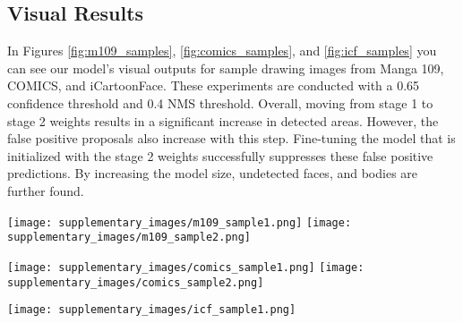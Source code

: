 \documentclass{article}
\begin{document}
\subsection{Visual Results}

In Figures \ref{fig:m109_samples}, \ref{fig:comics_samples}, and \ref{fig:icf_samples} you can see our model's visual outputs for sample drawing images from Manga 109, COMICS, and iCartoonFace. These experiments are conducted with a 0.65 confidence threshold and 0.4 NMS threshold. Overall, moving from stage 1 to stage 2 weights results in a significant increase in detected areas. However, the false positive proposals also increase with this step. Fine-tuning the model that is initialized with the stage 2 weights successfully suppresses these false positive predictions. By increasing the model size, undetected faces, and bodies are further found.

\begin{figure*}
    \centering
    \texttt{[image: supplementary\_images/m109\_sample1.png]}
    \texttt{[image: supplementary\_images/m109\_sample2.png]}
    \caption{Sample results from Manga 109 pages. Top-left: stage 1 weights, top-right: stage 2 weights, bottom-left: stage 3 weights, bottom-right: stage 3 XL model weights. Better viewed by zooming.}
    \label{fig:m109_samples}
\end{figure*}

\begin{figure*}
    \centering
    \texttt{[image: supplementary\_images/comics\_sample1.png]}
    \texttt{[image: supplementary\_images/comics\_sample2.png]}
    \caption{Sample results from COMICS pages. Left to right: stage 1 weights, stage 2 weights, stage 3 weights, stage 3 XL model weights. Better viewed by zooming.}
    \label{fig:comics_samples}
\end{figure*}

\begin{figure*}
    \centering
    \texttt{[image: supplementary\_images/icf\_sample1.png]}
    \caption{Sample results from iCartoonFace. Left to right: stage 1 weights, stage 2 weights, stage 3 weights, stage 3 XL model weights. Better viewed by zooming.}
    \label{fig:icf_samples}
\end{figure*}

\fi
\end{document}
